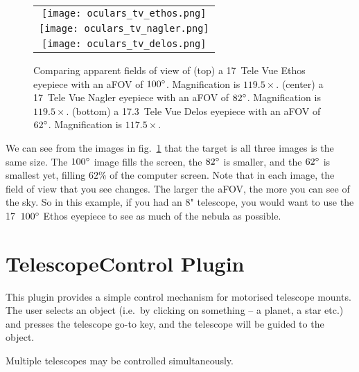 \begin{figure}[p]\centering
\begin{tabular}{c}
\texttt{[image: oculars\_tv\_ethos.png]}\\
\texttt{[image: oculars\_tv\_nagler.png]}\\
\texttt{[image: oculars\_tv\_delos.png]}
\end{tabular}
\caption{Comparing apparent fields of view of (top) a 17\mm\ Tele Vue Ethos eyepiece with an aFOV of $100\degree$. Magnification is $119.5\times$.
(center) a 17\mm\ Tele Vue Nagler eyepiece with an aFOV of $82\degree$. Magnification is $119.5\times$.
(bottom) a 17.3\mm\ Tele Vue Delos eyepiece with an aFOV of $62\degree$. Magnification is $117.5\times$.}
\label{fig:plugins:Oculars:TeleVue}
\end{figure}


We can see from the images in fig.~\ref{fig:plugins:Oculars:TeleVue}
that the target is all three images is the same size. The $100\degree$ image fills the screen, 
the $82\degree$ is smaller, and the $62\degree$ is smallest yet, filling $62\%$ of the computer screen. 
Note that in each image, the field of view that you see changes. The larger the aFOV, the more you can see of the sky. 
So in this example, if you had an 8" telescope, you would want to use the 17\mm\ $100\degree$ Ethos eyepiece to see as much of the nebula as possible.

\newpage
\section{TelescopeControl Plugin}
\label{sec:plugins:TelescopeControl}

This plugin provides a simple control mechanism for motorised
telescope mounts. The user selects an object (i.e.\ by clicking on
something -- a planet, a star etc.) and presses the telescope go-to
key, and the telescope will be guided to the object.

Multiple telescopes may be controlled simultaneously. 

% 
% 

